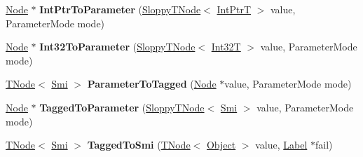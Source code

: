 \begin{DoxyCompactItemize}
\item 
\mbox{\label{classv8_1_1internal_1_1CodeStubAssembler_ac76f296ee452f7e488273e3dc85fe06d}} 
\mbox{\hyperlink{classv8_1_1internal_1_1compiler_1_1Node}{Node}} $\ast$ {\bfseries Int\+Ptr\+To\+Parameter} (\mbox{\hyperlink{classv8_1_1internal_1_1compiler_1_1SloppyTNode}{Sloppy\+T\+Node}}$<$ \mbox{\hyperlink{structv8_1_1internal_1_1IntPtrT}{Int\+PtrT}} $>$ value, Parameter\+Mode mode)
\item 
\mbox{\label{classv8_1_1internal_1_1CodeStubAssembler_a490373b2ee535a7aea39a31a66fcdf68}} 
\mbox{\hyperlink{classv8_1_1internal_1_1compiler_1_1Node}{Node}} $\ast$ {\bfseries Int32\+To\+Parameter} (\mbox{\hyperlink{classv8_1_1internal_1_1compiler_1_1SloppyTNode}{Sloppy\+T\+Node}}$<$ \mbox{\hyperlink{structv8_1_1internal_1_1Int32T}{Int32T}} $>$ value, Parameter\+Mode mode)
\item 
\mbox{\label{classv8_1_1internal_1_1CodeStubAssembler_a6551fc196763b0625dce4c8795857923}} 
\mbox{\hyperlink{classv8_1_1internal_1_1compiler_1_1TNode}{T\+Node}}$<$ \mbox{\hyperlink{classv8_1_1internal_1_1Smi}{Smi}} $>$ {\bfseries Parameter\+To\+Tagged} (\mbox{\hyperlink{classv8_1_1internal_1_1compiler_1_1Node}{Node}} $\ast$value, Parameter\+Mode mode)
\item 
\mbox{\label{classv8_1_1internal_1_1CodeStubAssembler_a9da167ae25404c8e4c3867fd549ecee1}} 
\mbox{\hyperlink{classv8_1_1internal_1_1compiler_1_1Node}{Node}} $\ast$ {\bfseries Tagged\+To\+Parameter} (\mbox{\hyperlink{classv8_1_1internal_1_1compiler_1_1SloppyTNode}{Sloppy\+T\+Node}}$<$ \mbox{\hyperlink{classv8_1_1internal_1_1Smi}{Smi}} $>$ value, Parameter\+Mode mode)
\item 
\mbox{\label{classv8_1_1internal_1_1CodeStubAssembler_a89dbc0288743ad9851861e6e90cc6f4e}} 
\mbox{\hyperlink{classv8_1_1internal_1_1compiler_1_1TNode}{T\+Node}}$<$ \mbox{\hyperlink{classv8_1_1internal_1_1Smi}{Smi}} $>$ {\bfseries Tagged\+To\+Smi} (\mbox{\hyperlink{classv8_1_1internal_1_1compiler_1_1TNode}{T\+Node}}$<$ \mbox{\hyperlink{classv8_1_1internal_1_1Object}{Object}} $>$ value, \mbox{\hyperlink{classv8_1_1internal_1_1compiler_1_1CodeAssemblerLabel}{Label}} $\ast$fail)

\end{DoxyCompactItemize}

